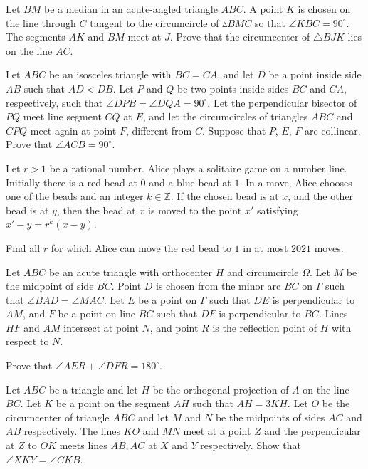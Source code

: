 \documentclass[11pt]{scrartcl}
\begin{document}
\begin{problem}[1891712635906763103]
	Let $BM$ be a median in an acute-angled triangle $ABC$. A point $K$ is chosen on the line through $C$ tangent to the circumcircle of $\vartriangle BMC$ so that $\angle KBC = 90^\circ$. The segments $AK$ and $BM$ meet at $J$. Prove that the circumcenter of $\triangle BJK$ lies on the line $AC$.
\end{problem}
\begin{problem}[6302540840099076878]
Let $ABC$ be an isosceles triangle with $BC=CA$, and let $D$ be a point inside side $AB$ such that $AD< DB$. Let $P$ and $Q$ be two points inside sides $BC$ and $CA$, respectively, such that $\angle DPB = \angle DQA = 90^{\circ}$. Let the perpendicular bisector of $PQ$ meet line segment $CQ$ at $E$, and let the circumcircles of triangles $ABC$ and $CPQ$ meet again at point $F$, different from $C$.
Suppose that $P$, $E$, $F$ are collinear. Prove that $\angle ACB = 90^{\circ}$.
\end{problem}
\begin{problem}[8866273454792491736]
	Let $r>1$ be a rational number. Alice plays a solitaire game on a number line. Initially there is a red bead at $0$ and a blue bead at $1$. In a move, Alice chooses one of the beads and an integer $k \in \mathbb{Z}$. If the chosen bead is at $x$, and the other bead is at $y$, then the bead at $x$ is moved to the point $x'$ satisfying $x'-y=r^k(x-y)$.

Find all $r$ for which Alice can move the red bead to $1$ in at most $2021$ moves.
\end{problem}
\begin{problem}[227919487650283]
Let $ABC$ be an acute triangle with orthocenter $H$ and circumcircle $\Omega$. Let $M$ be the midpoint of side $BC$. Point $D$ is chosen from the minor arc $BC$ on $\Gamma$ such that $\angle BAD = \angle MAC$. Let $E$ be a point on $\Gamma$ such that $DE$ is perpendicular to $AM$, and $F$ be a point on line $BC$ such that $DF$ is perpendicular to $BC$. Lines $HF$ and $AM$ intersect at point $N$, and point $R$ is the reflection point of $H$ with respect to $N$.

Prove that $\angle AER + \angle DFR = 180^\circ$.
\end{problem}
\begin{problem}[493493847475466779]
Let $ABC$ be a triangle and let $H$ be the orthogonal projection of $A$ on the line $BC$. Let $K$ be a point on the segment $AH$ such that $AH = 3 KH$. Let $O$ be the circumcenter of triangle $ABC$ and let $M$ and $N$ be the midpoints of sides $AC$ and $AB$ respectively. The lines $KO$ and $MN$ meet at a point $Z$ and the perpendicular at $Z$ to $OK$ meets lines $AB, AC$ at $X$ and $Y$ respectively. Show that $\angle XKY = \angle CKB$.
\end{problem}
\end{document}
